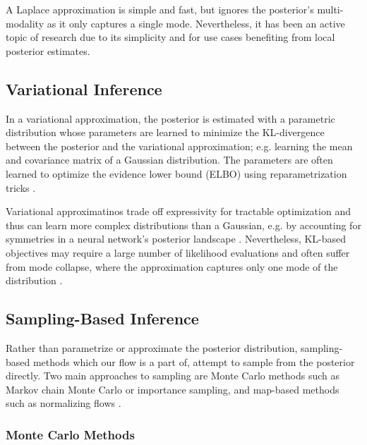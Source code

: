 A Laplace approximation is simple and fast, but ignores the posterior's multi-modality as it only captures a single mode. Nevertheless, it has been an active topic of research \citep{daxbergerLaplaceReduxEffortless2021} due to its simplicity and for use cases benefiting from local posterior estimates. 

\subsection{Variational Inference}

In a variational approximation, the posterior is estimated with a parametric distribution whose parameters are learned to minimize the KL-divergence between the posterior and the variational approximation; e.g. learning the mean and covariance matrix of a Gaussian distribution. The parameters are often learned to optimize the evidence lower bound (ELBO) using reparametrization tricks \citep{kingmaAutoEncodingVariationalBayes2022b,blundellWeightUncertaintyNeural2015a}. 

Variational approximatinos trade off expressivity for tractable optimization and thus can learn more complex distributions than a Gaussian, e.g. by accounting for symmetries in a neural network's posterior landscape \citep{gelbergVariationalInferenceFailures2024}. Nevertheless, KL-based objectives may require a large number of likelihood evaluations and often suffer from mode collapse, where the approximation captures only one mode of the distribution \citep{felardosDesigningLossesDatafree2023}. 

\subsection{Sampling-Based Inference}

Rather than parametrize or approximate the posterior distribution, sampling-based methods which our flow is a part of, attempt to sample from the posterior directly. Two main approaches to sampling are Monte Carlo methods \citep{barbuMonteCarloMethods2020} such as Markov chain Monte Carlo or importance sampling, and map-based methods \citep{marzoukSamplingMeasureTransport2016} such as normalizing flows \citep{rezendeVariationalInferenceNormalizing2015}.

\subsubsection{Monte Carlo Methods}

